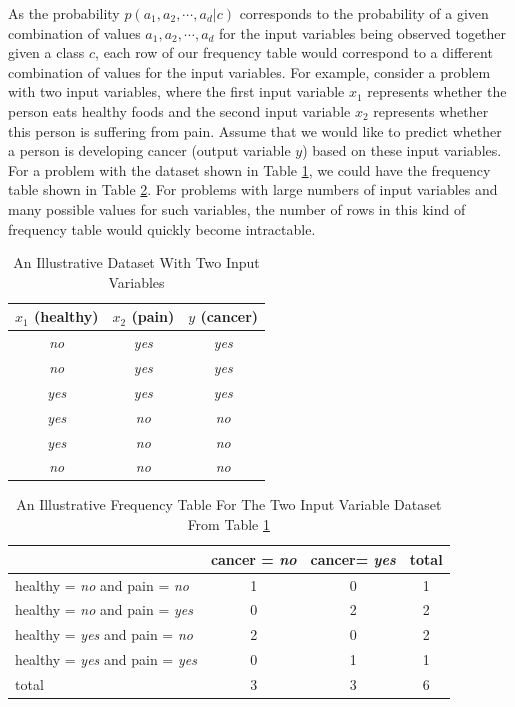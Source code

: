 As the probability $p(a_1,a_2,\cdots,a_d|c)$ corresponds to the probability of a given combination of values $a_1,a_2,\cdots,a_d$ for the input variables being observed together given a class $c$, each row of our frequency table would correspond to a different combination of values for the input variables. For example, consider a problem with two input variables, where the first input variable $x_1$ represents whether the person eats healthy foods and the second input variable $x_2$ represents whether this person is suffering from pain. Assume that we would like to predict whether a person is developing cancer (output variable $y$) based on these input variables. For a problem with the dataset shown in Table \ref{tab:dataset-2dim}, we could have the frequency table shown in Table \ref{tab:frequency-2dim}. For problems with large numbers of input variables and many possible values for such variables, the number of rows in this kind of frequency table would quickly become intractable. 


\begin{table}[ht]
\centering
\caption{An Illustrative Dataset With Two Input Variables} \label{tab:dataset-2dim}
\begin{tabular}{|c|c|c|} \hline
$x_1$ (healthy) & $x_2$ (pain) & $y$ (cancer) \\ \hline
\textit{no} & \textit{yes} & \textit{yes} \\
\textit{no} & \textit{yes} & \textit{yes} \\
\textit{yes} & \textit{yes} & \textit{yes} \\
\textit{yes} & \textit{no} & \textit{no} \\
\textit{yes} & \textit{no} & \textit{no} \\
\textit{no} & \textit{no} & \textit{no} \\ \hline
\end{tabular}
\end{table}

\begin{table}[ht]
\centering
\caption{An Illustrative Frequency Table For The Two Input Variable Dataset From Table \ref{tab:dataset-2dim}} \label{tab:frequency-2dim}
\begin{tabular}{|l|c|c|c|} \hline
 & cancer = \textit{no}  & cancer= \textit{yes} & total \\ \hline
healthy = \textit{no} and pain = \textit{no} & 1 & 0 & 1 \\ \hline
healthy = \textit{no} and pain = \textit{yes} & 0 & 2 & 2 \\ \hline
healthy = \textit{yes} and pain = \textit{no} & 2 & 0 & 2 \\ \hline
healthy = \textit{yes} and pain = \textit{yes} & 0 & 1 & 1 \\ \hline
total & 3 & 3 & 6 \\ \hline
\end{tabular}
\end{table}


